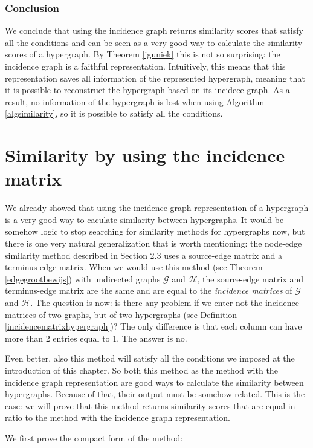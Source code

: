 \documentclass[a4paper,11pt]{report}
\newcommand{\graf}{\mathscr{G}}
\newcommand{\grafeen}{\mathscr{H}}
\begin{document}
  \subsubsection{Conclusion}
  We conclude that using the incidence graph returns similarity scores that 
  satisfy all the conditions and can be seen as a very good way to calculate the 
  similarity scores of a hypergraph. By Theorem \ref{iguniek} this is not so 
  surprising: the incidence graph is a faithful representation. Intuitively, 
  this means that this representation saves all information of the represented 
  hypergraph, meaning that it is possible to reconstruct the hypergraph based on 
  its incidece graph. As a result, no information of the hypergraph is lost when using Algorithm \ref{algsimilarity},
  so it is possible to satisfy all the conditions. 
  \section{Similarity by using the incidence matrix}
We already showed that using the incidence graph representation of a hypergraph
is a very good way to caculate similarity between hypergraphs. It would be somehow logic to stop searching for similarity methods
for hypergraphs now, but there is one very natural generalization that is worth mentioning: the node-edge similarity 
method described in Section 2.3 uses a source-edge matrix and a terminus-edge 
matrix. When we would use this method (see Theorem \ref{edgegrootbewijs}) with undirected graphs $\graf$ and $\grafeen$, the source-edge matrix and terminus-edge
matrix are the same and are equal to the \textit{incidence matrices} of $\graf$ and 
$\grafeen$. The question is now: is there any problem if we enter not the incidence matrices of two graphs, but of 
two hypergraphs (see Definition \ref{incidencematrixhypergraph})? The only difference is that each
column can have more than 2 entries equal to 1. The answer is 
no. 

Even better, also this method will satisfy all the conditions we imposed at the introduction of this chapter. 
So both this method as the method with the incidence graph representation 
are good ways to calculate the similarity between hypergraphs. Because of that, 
their output must be somehow related. This is the case: we will prove that this method 
returns similarity scores that are equal in ratio to the method with the 
incidence graph representation.

We first prove the compact form of the method:
\end{document}
